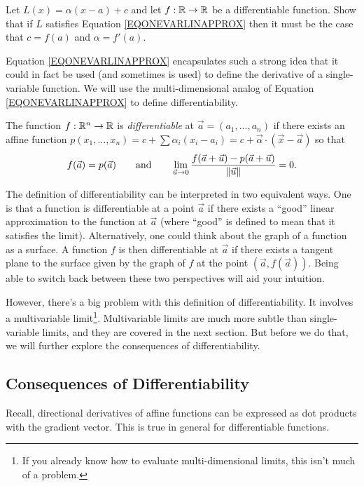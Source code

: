\begin{exercise}
	Let $L(x)=\alpha(x-a)+c$ and let $f:\mathbb{R}\to\mathbb{R}$ be a differentiable function.
	Show that if $L$ satisfies Equation \eqref{EQONEVARLINAPPROX} then it
	must be the case that $c=f(a)$ and $\alpha=f'(a)$.
\end{exercise}

Equation \eqref{EQONEVARLINAPPROX} encapsulates such a strong idea that
it could in fact be used (and sometimes is used) to define the derivative
of a single-variable function.  We will use the multi-dimensional
analog of Equation \eqref{EQONEVARLINAPPROX} to define differentiability.

\begin{definition}[Differentiable]
	The function $f:\mathbb{R}^n\to \mathbb{R}$ is 
	\emph{differentiable}
	at $\vec a=(a_1,\ldots,a_n)$ if there exists
	an affine function $p(x_1,\ldots, x_n)
	= c+\sum \alpha_i (x_i-a_i) = c+\vec \alpha \cdot(\vec x-\vec a)$ so that
	\[
		f(\vec a)=p(\vec a)\qquad\text{and}\qquad\lim_{\vec u\to0} \frac{f(\vec a + \vec u)-p(\vec a + \vec u)}{\lVert\vec u\rVert} = 0.
	\]
\end{definition}

The definition of differentiability can be interpreted in two equivalent
ways.  One is that a function is differentiable at a point $\vec a$ if there exists a ``good''
linear approximation to the function at $\vec a$ (where ``good'' is defined
to mean that it satisfies the limit).  Alternatively, one could think
about the graph of a function as a surface.  A function $f$ is then differentiable
at $\vec a$ if there exists a tangent plane to the surface given by the graph
of $f$ at the point $(\vec a, f(\vec a))$.  Being able to switch back between these
two perspectives will aid your intuition.

However, there's a big problem with this definition of differentiability.  It
involves a multivariable limit\footnote{ If you already know how to evaluate
multi-dimensional limits, this isn't much of a problem.}.  Multivariable limits
are much more subtle than single-variable limits, and they are covered in the next
section.  But before we do that, we will further explore the consequences of 
differentiability.

\subsection{Consequences of Differentiability}

Recall, directional derivatives of affine functions can be expressed
as dot products with the gradient vector.  This is true in general
for differentiable functions.

